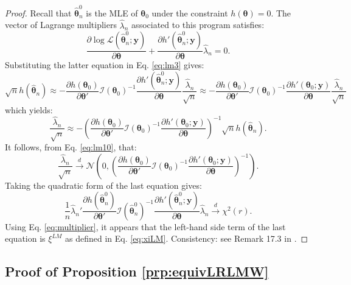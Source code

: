 \documentclass[
]{book}
\theoremstyle{definition}
\theoremstyle{definition}
\theoremstyle{definition}
\theoremstyle{definition}
\theoremstyle{remark}
\begin{document}
\begin{proof}
Recall that \(\hat{\boldsymbol\theta}^0_n\) is the MLE of \(\boldsymbol\theta_0\) under the constraint \(h(\boldsymbol\theta)=0\). The vector of Lagrange multipliers \(\hat\lambda_n\) associated to this program satisfies:
\begin{equation}
\frac{\partial \log \mathcal{L}(\hat{\boldsymbol\theta}^0_n;\mathbf{y})}{\partial \boldsymbol\theta}+ \frac{\partial h'(\hat{\boldsymbol\theta}^0_n;\mathbf{y})}{\partial \boldsymbol\theta}\hat\lambda_n = 0.\label{eq:multiplier}
\end{equation}
Substituting the latter equation in Eq. \eqref{eq:lm3} gives:
\[
\sqrt{n}h(\hat{\boldsymbol\theta}_n) \approx
- \dfrac{\partial h(\boldsymbol\theta_0)}{\partial \boldsymbol\theta'} \mathcal{I}(\boldsymbol\theta_0)^{-1}
\frac{\partial h'(\hat{\boldsymbol\theta}^0_n;\mathbf{y})}{\partial \boldsymbol\theta} \frac{\hat\lambda_n}{\sqrt{n}} \approx
- \dfrac{\partial h(\boldsymbol\theta_0)}{\partial \boldsymbol\theta'} \mathcal{I}(\boldsymbol\theta_0)^{-1}
\frac{\partial h'(\boldsymbol\theta_0;\mathbf{y})}{\partial \boldsymbol\theta} \frac{\hat\lambda_n}{\sqrt{n}}
\]
which yields:
\begin{equation}
\frac{\hat\lambda_n}{\sqrt{n}} \approx - \left(
\dfrac{\partial h(\boldsymbol\theta_0)}{\partial \boldsymbol\theta'} \mathcal{I}(\boldsymbol\theta_0)^{-1}
\frac{\partial h'(\boldsymbol\theta_0;\mathbf{y})}{\partial \boldsymbol\theta}
\right)^{-1}
\sqrt{n}h(\hat{\boldsymbol\theta}_n).\label{eq:lm20}
\end{equation}
It follows, from Eq. \eqref{eq:lm10}, that:
\[
\frac{\hat\lambda_n}{\sqrt{n}} \overset{d}{\rightarrow} \mathcal{N}\left(0,\left(
\dfrac{\partial h(\boldsymbol\theta_0)}{\partial \boldsymbol\theta'} \mathcal{I}(\boldsymbol\theta_0)^{-1}
\frac{\partial h'(\boldsymbol\theta_0;\mathbf{y})}{\partial \boldsymbol\theta}
\right)^{-1}\right).
\]
Taking the quadratic form of the last equation gives:
\[
\frac{1}{n}\hat\lambda_n' \dfrac{\partial h(\hat{\boldsymbol\theta}^0_n)}{\partial \boldsymbol\theta'} \mathcal{I}(\hat{\boldsymbol\theta}^0_n)^{-1}
\frac{\partial h'(\hat{\boldsymbol\theta}^0_n;\mathbf{y})}{\partial \boldsymbol\theta} \hat\lambda_n \overset{d}{\rightarrow} \chi^2(r).
\]
Using Eq. \eqref{eq:multiplier}, it appears that the left-hand side term of the last equation is \(\xi^{LM}\) as defined in Eq. \eqref{eq:xiLM}. Consistency: see Remark 17.3 in \citet{gourieroux_monfort_1995}.
\end{proof}

\hypertarget{equivLRLMW}{%
\subsection{Proof of Proposition \ref{prp:equivLRLMW}}\label{equivLRLMW}}
\end{document}
